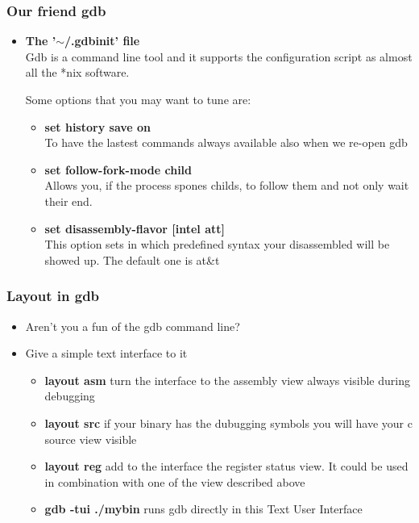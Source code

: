 \documentclass[]{beamer}
\begin{document}
      \begin{frame}
        \frametitle{Our friend gdb}
        \begin{itemize}
            \item{{\bf The '$\sim$/.gdbinit' file}}\\
            Gdb is a command line tool and it supports the configuration script as almost all the *nix software.

            Some options that you may want to tune are:
            \begin{itemize}
                \item{{\bf set history save on}}\\
                To have the lastest commands always available also when we re-open gdb
                \item{{\bf set follow-fork-mode child}}\\
                Allows you, if the process spones childs, to follow them and not only wait their end.
                \item{{\bf set disassembly-flavor [intel \textpipe{}  att]}}\\
                This option sets in which predefined syntax your disassembled will be showed up. The default one is at\&t
            \end{itemize}
        \end{itemize}
      \end{frame}

      \begin{frame}
        \frametitle{Layout in gdb}
        \begin{itemize}
            \item{Aren't you a fun of the gdb command line?}
            \item{Give a simple text interface to it}
            \begin{itemize}
                \item{{\bf layout asm} turn the interface to the assembly view always visible during debugging}
                \item{{\bf layout src} if your binary has the dubugging symbols you will have your c source view visible}
                \item{{\bf layout reg} add to the interface the register status view. It could be used in combination with one of the view described above}
                \item{{\bf gdb -tui ./mybin} runs gdb directly in this Text User Interface}
            \end{itemize}
        \end{itemize}
      \end{frame}
\end{document}
